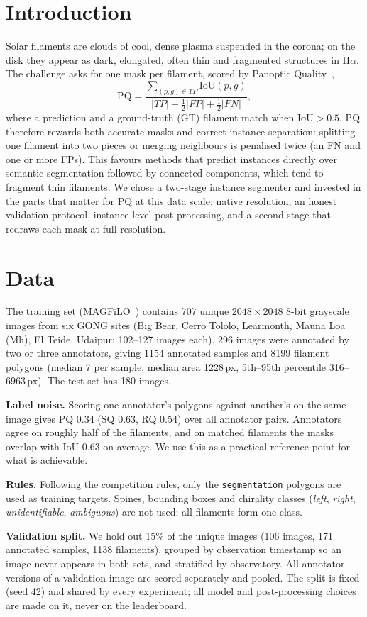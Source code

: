 \section{Introduction}
Solar filaments are clouds of cool, dense plasma suspended in the corona; on the disk they appear
as dark, elongated, often thin and fragmented structures in H$\alpha$. The challenge asks for one
mask per filament, scored by Panoptic Quality~\cite{kirillov2019panoptic},
\[
\mathrm{PQ}=\frac{\sum_{(p,g)\in TP}\mathrm{IoU}(p,g)}{|TP|+\tfrac12|FP|+\tfrac12|FN|},
\]
where a prediction and a ground-truth (GT) filament match when IoU$>0.5$. PQ therefore rewards
both accurate masks and correct instance separation: splitting one filament into two pieces or
merging neighbours is penalised twice (an FN and one or more FPs). This favours methods that
predict instances directly over semantic segmentation followed by connected components, which tend
to fragment thin filaments. We chose a two-stage instance segmenter and invested in the parts that
matter for PQ at this data scale: native resolution, an honest validation protocol,
instance-level post-processing, and a second stage that redraws each mask at full resolution.

\section{Data}
The training set (MAGFiLO~\cite{magfilo}) contains 707 unique $2048\times2048$ 8-bit grayscale
images from six GONG sites (Big Bear, Cerro Tololo, Learmonth, Mauna Loa (Mh), El Teide, Udaipur;
102--127 images each). 296 images were annotated by two or three annotators, giving 1154 annotated
samples and 8199 filament polygons (median 7 per sample, median area 1228\,px, 5th--95th
percentile 316--6963\,px). The test set has 180 images.

\textbf{Label noise.} Scoring one annotator's polygons against another's on the same image gives
PQ 0.34 (SQ 0.63, RQ 0.54) over all annotator pairs. Annotators agree on roughly half of the
filaments, and on matched filaments the masks overlap with IoU 0.63 on average. We use this as a
practical reference point for what is achievable.

\textbf{Rules.} Following the competition rules, only the \texttt{segmentation} polygons are used
as training targets. Spines, bounding boxes and chirality classes (\emph{left}, \emph{right},
\emph{unidentifiable}, \emph{ambiguous}) are not used; all filaments form one class.

\textbf{Validation split.} We hold out 15\% of the unique images (106 images, 171 annotated
samples, 1138 filaments), grouped by observation timestamp so an image never appears in both
sets, and stratified by observatory. All annotator versions of a validation image are scored
separately and pooled. The split is fixed (seed 42) and shared by every experiment; all model and
post-processing choices are made on it, never on the leaderboard.


